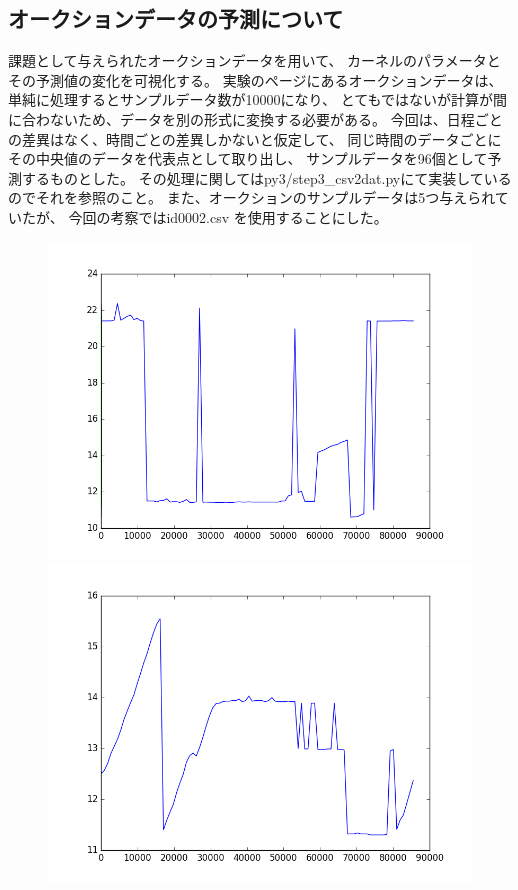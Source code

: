 \documentclass[]{jsarticle}
\begin{document}
\subsection{ オークションデータの予測について }
課題として与えられたオークションデータを用いて、
カーネルのパラメータとその予測値の変化を可視化する。
実験のページにあるオークションデータは、単純に処理するとサンプルデータ数が10000になり、
とてもではないが計算が間に合わないため、データを別の形式に変換する必要がある。
今回は、日程ごとの差異はなく、時間ごとの差異しかないと仮定して、
同じ時間のデータごとにその中央値のデータを代表点として取り出し、
サンプルデータを96個として予測するものとした。
その処理に関してはpy3/step3\_csv2dat.pyにて実装しているのでそれを参照のこと。
また、オークションのサンプルデータは5つ与えられていたが、
今回の考察ではid0002.csv を使用することにした。
\begin{figure}[htbp]
 \begin{minipage}[b]{0.5\hsize}
  \includegraphics[scale=0.4]{./images/id0001.png}
 \end{minipage}
 \begin{minipage}[b]{0.5\hsize}
  \includegraphics[scale=0.4]{./images/id0002.png}

\end{minipage}
\end{figure}
\end{document}
